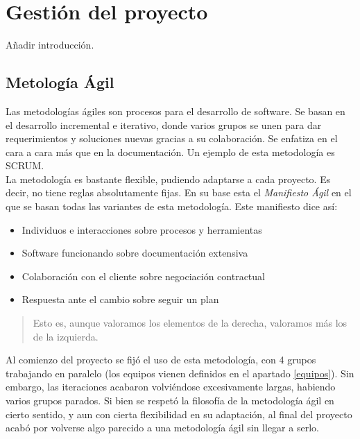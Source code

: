 
\chapter{Gestión del proyecto}
\label{gestion}

Añadir introducción.\\

\section{Metología Ágil}
\label{metodologia-agil}

Las metodologías ágiles son procesos para el desarrollo de software. Se basan en el desarrollo incremental e iterativo, donde varios grupos se unen para dar requerimientos y soluciones nuevas gracias a su colaboración. Se enfatiza en el cara a cara más que en la documentación. Un ejemplo de esta metodología es SCRUM.\\

La metodología es bastante flexible, pudiendo adaptarse a cada proyecto. Es decir, no tiene reglas absolutamente fijas. En su base esta el \textit{Manifiesto Ágil} en el que se basan todas las variantes de esta metodología. Este manifiesto \hyperref[manifiestoagil]{\cite{manifiestoagil}} dice así:

\begin{itemize}
\item Individuos e interacciones sobre procesos y herramientas
\item Software funcionando sobre documentación extensiva
\item Colaboración con el cliente sobre negociación contractual
\item Respuesta ante el cambio sobre seguir un plan
\end{itemize}

\begin{quote}
\small Esto es, aunque valoramos los elementos de la derecha, valoramos más los de la izquierda.
\end{quote}

Al comienzo del proyecto se fijó el uso de esta metodología, con 4 grupos trabajando en paralelo (los equipos vienen definidos en el apartado \ref{equipos}). Sin embargo, las iteraciones acabaron volviéndose excesivamente largas, habiendo varios grupos parados. Si bien se respetó la filosofía de la metodología ágil en cierto sentido, y aun con cierta flexibilidad en su adaptación, al final del proyecto acabó por volverse algo parecido a una metodología ágil sin llegar a serlo.\\

